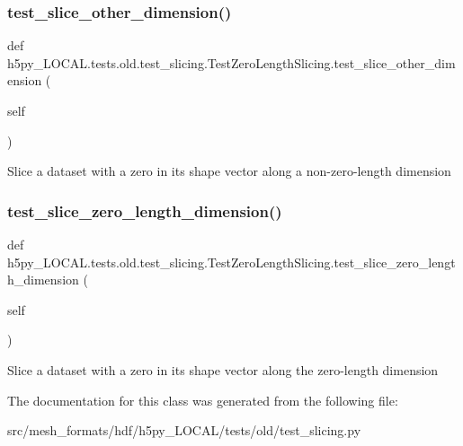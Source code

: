 \subsubsection{\texorpdfstring{test\+\_\+slice\+\_\+other\+\_\+dimension()}{test\_slice\_other\_dimension()}}
{\footnotesize\ttfamily def h5py\+\_\+\+L\+O\+C\+A\+L.\+tests.\+old.\+test\+\_\+slicing.\+Test\+Zero\+Length\+Slicing.\+test\+\_\+slice\+\_\+other\+\_\+dimension (\begin{DoxyParamCaption}\item[{}]{self }\end{DoxyParamCaption})}

\begin{DoxyVerb}Slice a dataset with a zero in its shape vector
    along a non-zero-length dimension \end{DoxyVerb}
 \mbox{\label{classh5py__LOCAL_1_1tests_1_1old_1_1test__slicing_1_1TestZeroLengthSlicing_a764c08d9b185f407615b42f456a3422a}} 
\subsubsection{\texorpdfstring{test\+\_\+slice\+\_\+zero\+\_\+length\+\_\+dimension()}{test\_slice\_zero\_length\_dimension()}}
{\footnotesize\ttfamily def h5py\+\_\+\+L\+O\+C\+A\+L.\+tests.\+old.\+test\+\_\+slicing.\+Test\+Zero\+Length\+Slicing.\+test\+\_\+slice\+\_\+zero\+\_\+length\+\_\+dimension (\begin{DoxyParamCaption}\item[{}]{self }\end{DoxyParamCaption})}

\begin{DoxyVerb}Slice a dataset with a zero in its shape vector
    along the zero-length dimension \end{DoxyVerb}
 

The documentation for this class was generated from the following file\+:\begin{DoxyCompactItemize}
\item 
src/mesh\+\_\+formats/hdf/h5py\+\_\+\+L\+O\+C\+A\+L/tests/old/test\+\_\+slicing.\+py\end{DoxyCompactItemize}
